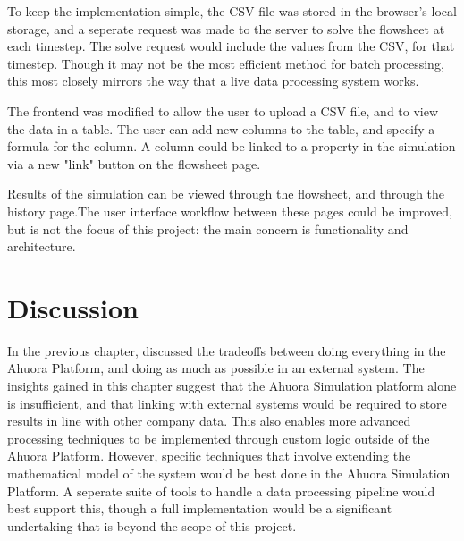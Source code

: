 To keep the implementation simple, the CSV file was stored in the browser's local storage, and a seperate request was made to the server to solve the flowsheet at each timestep. The solve request would include the values from the CSV, for that timestep. Though it may not be the most efficient method for batch processing, this most closely mirrors the way that a live data processing system works. 

The frontend was modified to allow the user to upload a CSV file, and to view the data in a table. The user can add new columns to the table, and specify a formula for the column. A column could be linked to a property in the simulation via a new "link" button on the flowsheet page. 

Results of the simulation can be viewed through the flowsheet, and through the history page.The user interface workflow between these pages could be improved, but is not the focus of this project: the main concern is functionality and architecture.






\section{Discussion}


In the previous chapter,  discussed the tradeoffs between doing everything in the Ahuora Platform, and doing as much as possible in an external system. The insights gained in this chapter suggest that the Ahuora Simulation platform alone is insufficient, and that linking with external systems would be required to store results in line with other company data. This also enables more advanced processing techniques to be implemented through custom logic outside of the Ahuora Platform. However, specific techniques that involve extending the mathematical model of the system would be best done in the Ahuora Simulation Platform. A seperate suite of tools to handle a data processing pipeline would best support this, though a full implementation would be a significant undertaking that is beyond the scope of this project. 

